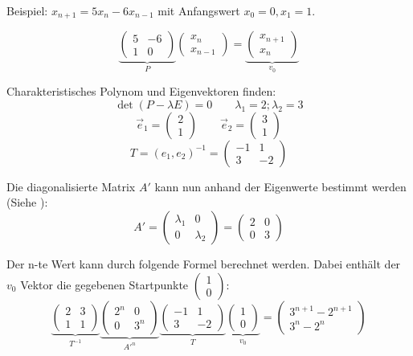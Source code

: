 \noindent Beispiel: $x_{n+1} = 5x_n - 6x_{n-1}$ mit Anfangswert $x_0 = 0, x_1 = 1$.

\[
	\underbrace{\begin{pmatrix}	5 & -6 \\ 1 & 0	\end{pmatrix}}_{P} 
	\begin{pmatrix} x_n \\ x_{n-1} \end{pmatrix} 
	=
	\underbrace{\begin{pmatrix} x_{n+1} \\ x_n \end{pmatrix}}_{v_0}
\]

\noindent Charakteristisches Polynom und Eigenvektoren finden:
\[ \det(P - \lambda E) = 0 \qquad {\scriptstyle \lambda_1 = 2; \lambda_2 = 3} \]
\[\vec{e}_1 = \begin{pmatrix} 2 \\ 1 \end{pmatrix} \qquad \vec{e}_2 = \begin{pmatrix} 3 \\ 1 \end{pmatrix}\]
\[ T = (e_1, e_2)^{-1} = \begin{pmatrix} -1 & 1 \\ 3 & -2 \end{pmatrix} \]


\noindent Die diagonalisierte Matrix $A'$ kann nun anhand der Eigenwerte bestimmt werden (Siehe ):
\[
A' = 
\begin{pmatrix}
	\lambda_1 & 0 \\ 0 & \lambda_2 
\end{pmatrix} 
=
\begin{pmatrix}
	2 & 0 \\ 0 & 3
\end{pmatrix}
\]

\noindent Der n-te Wert kann durch folgende Formel berechnet werden. Dabei enthält der $v_0$ Vektor die gegebenen Startpunkte $\begin{pmatrix}1 \\ 0 \end{pmatrix}$:
\[
\underbrace{\begin{pmatrix} 2 & 3 \\ 1 & 1 \end{pmatrix}}_{T^{-1}}
\underbrace{\begin{pmatrix} 2^n & 0\\ 0 & 3^n \end{pmatrix}}_{A'^n}
\underbrace{\begin{pmatrix} -1 & 1 \\ 3 & -2 \end{pmatrix}}_{T}
\underbrace{\begin{pmatrix}1 \\ 0 \end{pmatrix}}_{v_0}
= 
\begin{pmatrix}
	3^{n+1} - 2^{n+1} \\ 3^n - 2^n
\end{pmatrix}
\]

